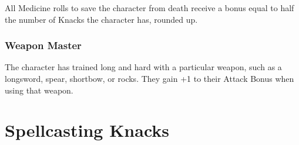 \begin{multicols}{2}
All Medicine rolls to save the character from death receive a bonus equal to half the number of Knacks the character has, rounded up.

\subsubsection{Weapon Master}

The character has trained long and hard with a particular weapon, such as a longsword, spear, shortbow, or rocks.
They gain +1 to their Attack Bonus when using that weapon.

\end{multicols}

\section{Spellcasting Knacks}

